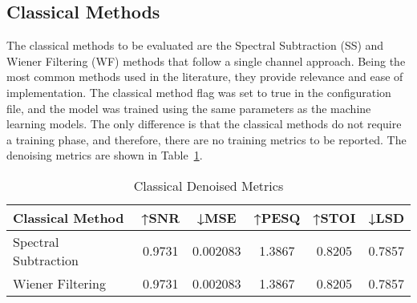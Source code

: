 \subsection{Classical Methods}
\label{sec:classical_methods}

The classical methods to be evaluated are the Spectral Subtraction (SS) and Wiener Filtering (WF) methods that follow a single channel approach. Being the most common methods used in the literature, they provide relevance and ease of implementation. The classical method flag was set to true in the configuration file, and the model was trained using the same parameters as the machine learning models. The only difference is that the classical methods do not require a training phase, and therefore, there are no training metrics to be reported. The denoising metrics are shown in Table~\ref{tab:classical_metrics}.

\vspace{1em}
\begin{table}[H]
\centering
\caption{Classical Denoised Metrics}
\label{tab:classical_metrics}
\begin{tabular}{|l|c|c|c|c|c|}
\hline
\textbf{Classical Method} & \textbf{↑SNR} & \textbf{↓MSE} & \textbf{↑PESQ} & \textbf{↑STOI} & \textbf{↓LSD} \\
\hline
Spectral Subtraction & 0.9731 & 0.002083 & 1.3867 & 0.8205 & 0.7857 \\
Wiener Filtering    & 0.9731 & 0.002083 & 1.3867 & 0.8205 & 0.7857 \\
\hline
\end{tabular}
\end{table}
